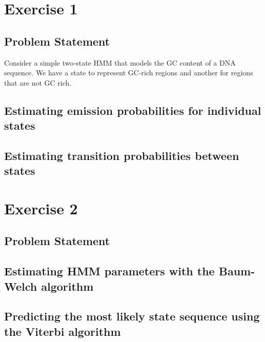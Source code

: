 \documentclass[11pt, oneside]{article}
\begin{document}
\section{Exercise 1}
\subsection{Problem Statement}
Consider a simple two-state HMM that models the GC content of a DNA sequence. 
We have a state to represent GC-rich regions and another for regions that are not GC rich.
\subsection{Estimating emission probabilities for individual states}
\subsection{Estimating transition probabilities between states}

\section{Exercise 2}
\subsection{Problem Statement}
\subsection{Estimating HMM parameters with the Baum-Welch algorithm}
\subsection{Predicting the most likely state sequence using the Viterbi algorithm}
\end{document}
